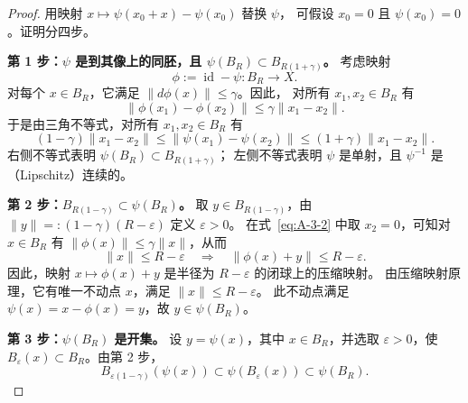 \begin{proof}
用映射 $x\mapsto\psi(x_0+x)-\psi(x_0)$ 替换 $\psi$，
可假设 $x_0=0$ 且 $\psi(x_0)=0$。证明分四步。

\noindent\textbf{第 1 步：$\psi$ 是到其像上的同胚，且
$\psi(B_R)\subset B_{R(1+\gamma)}$。}
考虑映射
\[
  \phi:=\operatorname{id}-\psi:B_R\to X.
\]
对每个 $x\in B_R$，它满足 $\|d\phi(x)\|\le\gamma$。因此，
对所有 $x_1,x_2\in B_R$ 有
\begin{equation}\label{eq:A-3-2}
  \|\phi(x_1)-\phi(x_2)\|\le\gamma\|x_1-x_2\|.
\end{equation}
于是由三角不等式，对所有 $x_1,x_2\in B_R$ 有
\begin{equation}\label{eq:A-3-3}
  (1-\gamma)\|x_1-x_2\|
  \le\|\psi(x_1)-\psi(x_2)\|
  \le(1+\gamma)\|x_1-x_2\|.
\end{equation}
右侧不等式表明 $\psi(B_R)\subset B_{R(1+\gamma)}$；
左侧不等式表明 $\psi$ 是单射，且 $\psi^{-1}$ 是（Lipschitz）连续的。

\noindent\textbf{第 2 步：$B_{R(1-\gamma)}\subset\psi(B_R)$。}
取 $y\in B_{R(1-\gamma)}$，由
$\|y\|=:(1-\gamma)(R-\varepsilon)$ 定义 $\varepsilon>0$。
在式~\eqref{eq:A-3-2} 中取 $x_2=0$，可知对 $x\in B_R$ 有
$\|\phi(x)\|\le\gamma\|x\|$，从而
\[
  \|x\|\le R-\varepsilon
  \quad\Longrightarrow\quad
  \|\phi(x)+y\|\le R-\varepsilon.
\]
因此，映射 $x\mapsto\phi(x)+y$ 是半径为 $R-\varepsilon$ 的闭球上的压缩映射。
由压缩映射原理，它有唯一不动点 $x$，满足 $\|x\|\le R-\varepsilon$。
此不动点满足 $\psi(x)=x-\phi(x)=y$，故 $y\in\psi(B_R)$。

\noindent\textbf{第 3 步：$\psi(B_R)$ 是开集。}
设 $y=\psi(x)$，其中 $x\in B_R$，并选取 $\varepsilon>0$，使
$B_\varepsilon(x)\subset B_R$。由第 2 步，
\[
  B_{\varepsilon(1-\gamma)}(\psi(x))
  \subset\psi(B_\varepsilon(x))\subset\psi(B_R).
\]


\end{proof}
